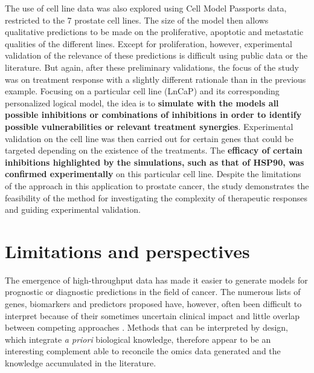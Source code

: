 \documentclass[a4paper,12pt,twoside,onecolumn,openright,final,oldfontcommands]{memoir}
\begin{document}
The use of cell line data was also explored using Cell Model Passports
data, restricted to the 7 prostate cell lines. The size of the model
then allows qualitative predictions to be made on the proliferative,
apoptotic and metastatic qualities of the different lines. Except for
proliferation, however, experimental validation of the relevance of
these predictions is difficult using public data or the literature. But
again, after these preliminary validations, the focus of the study was
on treatment response with a slightly different rationale than in the
previous example. Focusing on a particular cell line (LnCaP) and its
corresponding personalized logical model, the idea is to
\textbf{simulate with the models all possible inhibitions or
combinations of inhibitions in order to identify possible
vulnerabilities or relevant treatment synergies}. Experimental
validation on the cell line was then carried out for certain genes that
could be targeted depending on the existence of the treatments. The
\textbf{efficacy of certain inhibitions highlighted by the simulations,
such as that of HSP90, was confirmed experimentally} on this particular
cell line. Despite the limitations of the approach in this application
to prostate cancer, the study demonstrates the feasibility of the method
for investigating the complexity of therapeutic responses and guiding
experimental validation.

\section{Limitations and perspectives}\label{part2-limits}

The emergence of high-throughput data has made it easier to generate
models for prognostic or diagnostic predictions in the field of cancer.
The numerous lists of genes, biomarkers and predictors proposed have,
however, often been difficult to interpret because of their sometimes
uncertain clinical impact and little overlap between competing
approaches \citep{domany2014using}. Methods that can be interpreted by
design, which integrate \emph{a priori} biological knowledge, therefore
appear to be an interesting complement able to reconcile the omics data
generated and the knowledge accumulated in the literature.
\end{document}
